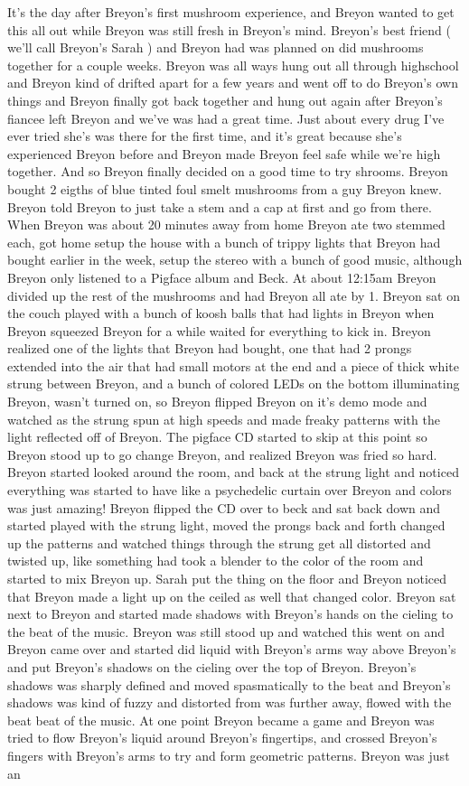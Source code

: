 \documentclass[12pt]{book}
\begin{document}
It's the day after Breyon's first mushroom experience, and Breyon wanted to get this all out while Breyon was still fresh in Breyon's mind. Breyon's best friend ( we'll call Breyon's Sarah ) and Breyon had was planned on did mushrooms together for a couple weeks. Breyon was all ways hung out all through highschool and Breyon kind of drifted apart for a few years and went off to do Breyon's own things and Breyon finally got back together and hung out again after Breyon's fiancee left Breyon and we've was had a great time. Just about every drug I've ever tried she's was there for the first time, and it's great because she's experienced Breyon before and Breyon made Breyon feel safe while we're high together. And so Breyon finally decided on a good time to try shrooms. Breyon bought 2 eigths of blue tinted foul smelt mushrooms from a guy Breyon knew. Breyon told Breyon to just take a stem and a cap at first and go from there. When Breyon was about 20 minutes away from home Breyon ate two stemmed each, got home setup the house with a bunch of trippy lights that Breyon had bought earlier in the week, setup the stereo with a bunch of good music, although Breyon only listened to a Pigface album and Beck. At about 12:15am Breyon divided up the rest of the mushrooms and had Breyon all ate by 1. Breyon sat on the couch played with a bunch of koosh balls that had lights in Breyon when Breyon squeezed Breyon for a while waited for everything to kick in. Breyon realized one of the lights that Breyon had bought, one that had 2 prongs extended into the air that had small motors at the end and a piece of thick white strung between Breyon, and a bunch of colored LEDs on the bottom illuminating Breyon, wasn't turned on, so Breyon flipped Breyon on it's demo mode and watched as the strung spun at high speeds and made freaky patterns with the light reflected off of Breyon. The pigface CD started to skip at this point so Breyon stood up to go change Breyon, and realized Breyon was fried so hard. Breyon started looked around the room, and back at the strung light and noticed everything was started to have like a psychedelic curtain over Breyon and colors was just amazing! Breyon flipped the CD over to beck and sat back down and started played with the strung light, moved the prongs back and forth changed up the patterns and watched things through the strung get all distorted and twisted up, like something had took a blender to the color of the room and started to mix Breyon up. Sarah put the thing on the floor and Breyon noticed that Breyon made a light up on the ceiled as well that changed color. Breyon sat next to Breyon and started made shadows with Breyon's hands on the cieling to the beat of the music. Breyon was still stood up and watched this went on and Breyon came over and started did liquid with Breyon's arms way above Breyon's and put Breyon's shadows on the cieling over the top of Breyon. Breyon's shadows was sharply defined and moved spasmatically to the beat and Breyon's shadows was kind of fuzzy and distorted from was further away, flowed with the beat beat of the music. At one point Breyon became a game and Breyon was tried to flow Breyon's liquid around Breyon's fingertips, and crossed Breyon's fingers with Breyon's arms to try and form geometric patterns. Breyon was just an 
\end{document}
